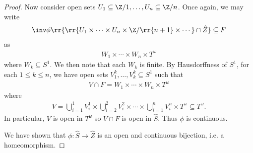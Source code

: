 \documentclass{article}
\begin{document}
\begin{claim*}
\begin{proof}
    Now consider open sets $U_1\subseteq \Z/1,\ldots,U_n\subseteq\Z/n$. Once again, we may
    write
    \begin{align*}
      \inv \phi\rr{\rr{U_1\times\cdots\times U_n\times\Z/\rr{n+1}\times\cdots}\cap\hat Z} \subseteq F
    \end{align*}
    as
    \begin{align*}
      W_1\times\cdots\times W_n\times T^\omega
    \end{align*}
    where $W_k\subseteq S^1$. We then note that each $W_k$ is finite. By Hausdorffness of $S^1$,
    for each $1\leq k\leq n$, we have open sets $V^k_1,\ldots,V_k^k\subseteq S^1$ such that
    \begin{align*}
      V\cap F = W_1\times\cdots\times W_n\times T^\omega
    \end{align*}
    where
    \begin{align*}
      V = \bigcup_{i=1}^1 V^1_i \times \bigcup_{i=2}^2 V^2_i\times\cdots\times\bigcup_{i=1}^n V^n_i\times T^\omega\subseteq T^\omega.
    \end{align*}
    In particular, $V$ is open in $T^\omega$ so $V\cap F$ is open in $\hat S$. Thus $\phi$ is continuous.

    We have shown that $\phi:\hat S\to\hat Z$ is an open and continuous bijection, i.e. a homeomorphism.
  \end{proof}
\end{claim*}
\end{document}
